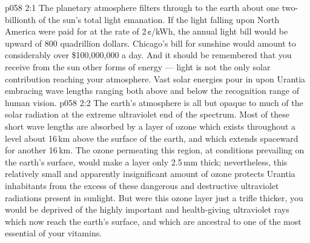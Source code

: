 \vs p058 2:1 The planetary atmosphere filters through to the earth about one two\hyp{}billionth of the sun’s total light emanation. If the light falling upon North America were paid for at the rate of 2\,¢/kWh, the annual light bill would be upward of 800 quadrillion dollars. Chicago’s bill for sunshine would amount to considerably over \$100,000,000 a day. And it should be remembered that you receive from the sun other forms of energy --- light is not the only solar contribution reaching your atmosphere. Vast solar energies pour in upon Urantia embracing wave lengths ranging both above and below the recognition range of human vision.
\vs p058 2:2 \pc The earth’s atmosphere is all but opaque to much of the solar radiation at the extreme ultraviolet end of the spectrum. Most of these short wave lengths are absorbed by a layer of ozone which exists throughout a level about 16\,km above the surface of the earth, and which extends spaceward for another 16\,km. The ozone permeating this region, at conditions prevailing on the earth’s surface, would make a layer only 2.5\,mm thick; nevertheless, this relatively small and apparently insignificant amount of ozone protects Urantia inhabitants from the excess of these dangerous and destructive ultraviolet radiations present in sunlight. But were this ozone layer just a trifle thicker, you would be deprived of the highly important and health\hyp{}giving ultraviolet rays which now reach the earth’s surface, and which are ancestral to one of the most essential of your vitamins.
